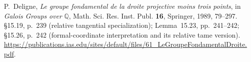P.~Deligne, \emph{Le groupe fondamental de la droite projective
moins trois points}, in \emph{Galois Groups over $\mathbb Q$},
Math. Sci. Res. Inst. Publ. \textbf{16}, Springer, 1989, 79--297.
\S15.19, p.~239 (relative tangential specialization);
Lemma~15.23, pp.~241--242; \S15.26, p.~242
(formal-coordinate interpretation and its relative tame version).
\url{https://publications.ias.edu/sites/default/files/61_LeGroupeFondamentalDroite.pdf}.
